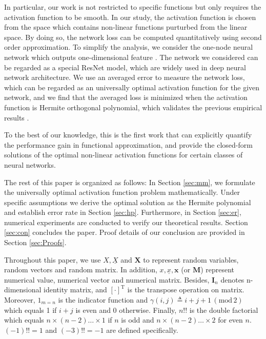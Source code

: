 \documentclass[conference]{IEEEtran}
\def\T{\mathrm{T}}
\newcommand{\ide}[2]{ \gamma(#1,#2) }
\begin{document}
In particular, our work is not restricted to specific functions but only requires the activation function to be smooth.
In our study, the activation function is chosen from the space which contains non-linear functions purturbed from the linear space.
By doing so, the network loss can be computed quantitatively using second order approximation.
To simplify the analysis, we consider the one-node neural network which outputs one-dimensional feature \cite{dey2018approximation}.
The network we considered can be regarded as a special ResNet model, which are widely used in deep neural network architecture.
We use an averaged error to measure the network loss, which can be regarded as an universally optimal activation function for the given network,
and we find that the averaged loss is minimized when the activation function is Hermite orthogonal polynomial, which
validates the previous empirical results \cite{ma2005constructive}.


To the best of our knowledge, this is the first work that can explicitly quantify the performance gain in functional approximation,
and provide the closed-form solutions of the optimal non-linear activation functions for certain classes of neural networks.

The rest of this paper is organized as follows: In Section \ref{sec:mm}, we formulate the universally optimal activation function problem
mathematically.
Under specific assumptions we derive the optimal solution as the Hermite polynomial and establish error rate in Section \ref{sec:hp}.
Furthermore, in Section \ref{sec:er}, numerical experiments are conducted to verify our theoretical results.
Section \ref{sec:con} concludes the paper. Proof details of our conclusion are provided in Section \ref{sec:Proofs}.

Throughout this paper,
we use $X,\underline{X}$ and $\bm{X} $ to represent random variables,
random vectors and
random matrix. In addition,
$x, \underline{x}, \bm{x}$ (or $\mathbf{M}$) represent numerical value,
numerical vector
and numerical matrix.
Besides, $\mathbf{I}_n$ denotes n-dimensional identity matrix, and
$[\cdot]^\T$ is the transpose operation on matrix. Moreover, $\mathrm{1}_{m=n}$ is the indicator function
and $\ide{i}{j} \triangleq i+j+1\, (\mathrm{mod} \, 2)$
which equals 1 if $ i + j$ is even and 0 otherwise. Finally,
$n!!$ is the double factorial which equals $n \times (n-2) \dots \times1$ if $n$ is odd and $n \times (n-2)\dots \times 2$ for even $n$. $(-1)!!=1$
and $(-3)!!=-1$
are defined specifically.
\end{document}
